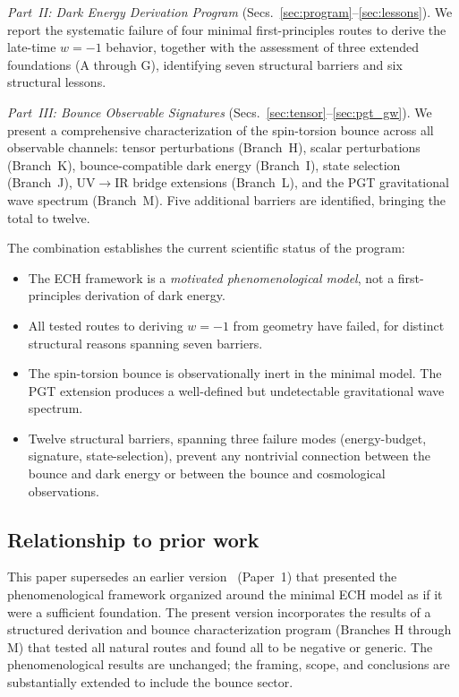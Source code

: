 \documentclass[aps,prd,twocolumn,superscriptaddress,showpacs,preprintnumbers,
  nofootinbib,longbibliography,floatfix]{revtex4-2}
\begin{document}
\textit{Part~II: Dark Energy Derivation Program} (Secs.~\ref{sec:program}--\ref{sec:lessons}).
We report the systematic failure of four minimal first-principles routes to
derive the late-time $w=-1$ behavior, together with the assessment of three
extended foundations (A through G), identifying seven structural barriers
and six structural lessons.

\textit{Part~III: Bounce Observable Signatures} (Secs.~\ref{sec:tensor}--\ref{sec:pgt_gw}).
We present a comprehensive characterization of the spin-torsion bounce
across all observable channels: tensor perturbations (Branch~H), scalar
perturbations (Branch~K), bounce-compatible dark energy (Branch~I), state
selection (Branch~J), UV$\to$IR bridge extensions (Branch~L), and the PGT
gravitational wave spectrum (Branch~M). Five additional barriers are
identified, bringing the total to twelve.

The combination establishes the current scientific status of the program:
\begin{itemize}[leftmargin=*]
  \item The ECH framework is a \textit{motivated phenomenological model},
    not a first-principles derivation of dark energy.
  \item All tested routes to deriving $w=-1$ from geometry have failed,
    for distinct structural reasons spanning seven barriers.
  \item The spin-torsion bounce is observationally inert in the minimal
    model. The PGT extension produces a well-defined but undetectable
    gravitational wave spectrum.
  \item Twelve structural barriers, spanning three failure modes
    (energy-budget, signature, state-selection), prevent any nontrivial
    connection between the bounce and dark energy or between the bounce
    and cosmological observations.
\end{itemize}

\subsection{Relationship to prior work}

This paper supersedes an earlier version~\cite{Golden2026v1} (Paper~1)
that presented the phenomenological framework organized around the minimal
ECH model as if it were a sufficient foundation. The present version
incorporates the results of a structured derivation and bounce
characterization program (Branches H through M) that tested all natural
routes and found all to be negative or generic. The phenomenological
results are unchanged; the framing, scope, and conclusions are
substantially extended to include the bounce sector.
\end{document}
